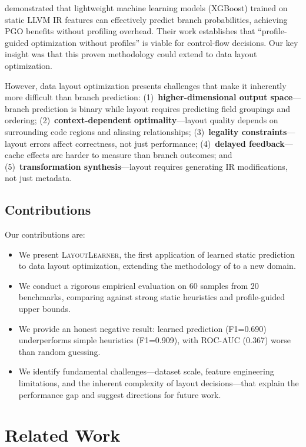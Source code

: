 \documentclass{article}
\begin{document}
\citet{rotem2021profile} demonstrated that lightweight machine learning models (XGBoost) trained on static LLVM IR features can effectively predict branch probabilities, achieving PGO benefits without profiling overhead. Their work establishes that ``profile-guided optimization without profiles'' is viable for control-flow decisions. Our key insight was that this proven methodology could extend to data layout optimization.

However, data layout optimization presents challenges that make it inherently more difficult than branch prediction: (1)~\textbf{higher-dimensional output space}---branch prediction is binary while layout requires predicting field groupings and ordering; (2)~\textbf{context-dependent optimality}---layout quality depends on surrounding code regions and aliasing relationships; (3)~\textbf{legality constraints}---layout errors affect correctness, not just performance; (4)~\textbf{delayed feedback}---cache effects are harder to measure than branch outcomes; and (5)~\textbf{transformation synthesis}---layout requires generating IR modifications, not just metadata.

\subsection{Contributions}

Our contributions are:
\begin{itemize}
    \item We present \textsc{LayoutLearner}, the first application of learned static prediction to data layout optimization, extending the methodology of \citet{rotem2021profile} to a new domain.
    \item We conduct a rigorous empirical evaluation on 60 samples from 20 benchmarks, comparing against strong static heuristics and profile-guided upper bounds.
    \item We provide an honest negative result: learned prediction (F1=0.690) underperforms simple heuristics (F1=0.909), with ROC-AUC (0.367) worse than random guessing.
    \item We identify fundamental challenges---dataset scale, feature engineering limitations, and the inherent complexity of layout decisions---that explain the performance gap and suggest directions for future work.
\end{itemize}

\section{Related Work}
\label{sec:related}
\end{document}
